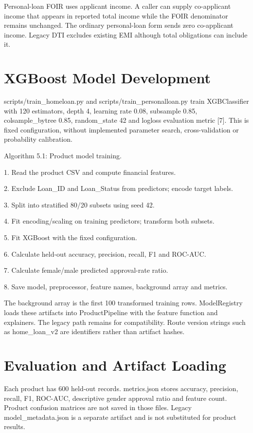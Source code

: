 \documentclass[12pt,a4paper]{report}
\begin{document}
Personal-loan FOIR uses applicant income. A caller can supply co-applicant income that appears in reported total income while the FOIR denominator remains unchanged. The ordinary personal-loan form sends zero co-applicant income. Legacy DTI excludes existing EMI although total obligations can include it.

\section{XGBoost Model Development}
scripts/train\_homeloan.py and scripts/train\_personalloan.py train XGBClassifier with 120 estimators, depth 4, learning rate 0.08, subsample 0.85, colsample\_bytree 0.85, random\_state 42 and logloss evaluation metric [7]. This is fixed configuration, without implemented parameter search, cross-validation or probability calibration.

Algorithm 5.1: Product model training.

1. Read the product CSV and compute financial features.

2. Exclude Loan\_ID and Loan\_Status from predictors; encode target labels.

3. Split into stratified 80/20 subsets using seed 42.

4. Fit encoding/scaling on training predictors; transform both subsets.

5. Fit XGBoost with the fixed configuration.

6. Calculate held-out accuracy, precision, recall, F1 and ROC-AUC.

7. Calculate female/male predicted approval-rate ratio.

8. Save model, preprocessor, feature names, background array and metrics.

The background array is the first 100 transformed training rows. ModelRegistry loads these artifacts into ProductPipeline with the feature function and explainers. The legacy path remains for compatibility. Route version strings such as home\_loan\_v2 are identifiers rather than artifact hashes.

\section{Evaluation and Artifact Loading}
Each product has 600 held-out records. metrics.json stores accuracy, precision, recall, F1, ROC-AUC, descriptive gender approval ratio and feature count. Product confusion matrices are not saved in those files. Legacy model\_metadata.json is a separate artifact and is not substituted for product results.
\end{document}
